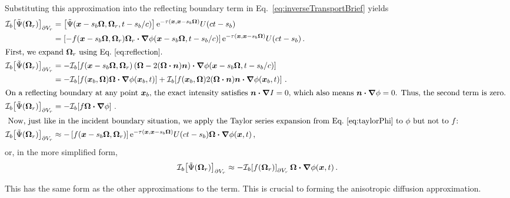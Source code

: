 Substituting this approximation into the reflecting boundary term in
Eq.~\eqref{eq:inverseTransportBrief} yields
\begin{align*}
\lopinv{b}{\tilde\Psi(\vec{\Omega}_r)}_{\partial V_r}
  &= \left[\tilde\Psi(\vec{x} - s_b\vec{\Omega}, \vec{\Omega}_r, t - s_b/c)
  \right]
    \eexp^{ -\tau(\vec{x}, \vec{x} - s_b \vec{\Omega})}
    U(ct - s_b)
\\
  &= \left[-f(\vec{x} - s_b\vec{\Omega}, \vec{\Omega}_r) \vec{\Omega}_r 
  \vd \grad \phi(\vec{x} - s_b\vec{\Omega}, t - s_b/c) \right]
  \eexp^{ -\tau(\vec{x}, \vec{x} - s_b \vec{\Omega})}
  U(ct - s_b) \,.
\\ 
\intertext{First, we expand $\vec{\Omega}_r$ using Eq.~\eqref{eq:reflection}.
}
\lopinv{b}{\tilde\Psi(\vec{\Omega}_r)}_{\partial V_r}
  &= - \lopinv{b}{f(\vec{x} - s_b\vec{\Omega}, \vec{\Omega}_r)
\left(  \vec{\Omega} - 2(\vec{\Omega} \vd \vec{n}) \vec{n} \right)
  \vd \grad \phi(\vec{x} - s_b\vec{\Omega}, t - s_b/c) }
  \\
  &= -\lopinv{b}{f(\vec{x}_b,\vec{\Omega}) \vec{\Omega} \vd \grad
  \phi(\vec{x}_b,t)}
  + \lopinv{b}{f(\vec{x}_b,\vec{\Omega}) 2(\vec{\Omega} \vd \vec{n}) \vec{n} \vd
  \grad \phi(\vec{x}_b,t) } \,.
\\ 
\intertext{On a reflecting boundary at any point $\vec{x}_b$, the exact
intensity satisfies $\vec{n} \vd
\grad I = 0$, which also means $\vec{n} \vd \grad \phi=0$. Thus, the second
term is zero.
}
\lopinv{b}{\tilde\Psi(\vec{\Omega}_r)}_{\partial V_r}
&= -\lopinv{b}{f \vec{\Omega} \vd \grad \phi} \,.
\\ \intertext{ Now, just like in the incident boundary situation, we apply the
Taylor
series expansion from Eq.~\eqref{eq:taylorPhi} to $\phi$ but not to $f$:
}
\lopinv{b}{\tilde\Psi(\vec{\Omega}_r)}_{\partial V_r}
&\approx
-\left[f(\vec{x} - s_b\vec{\Omega}, \vec{\Omega}_r)
  \right]
  \eexp^{ -\tau(\vec{x}, \vec{x} - s_b \vec{\Omega})}
  U(ct - s_b) \vec{\Omega} \vd \grad \phi(\vec{x}, t)\,,
\end{align*}
or, in the more simplified form,
\begin{equation} \label{eq:reflApprox}
\mathcal{I}_{b}\!\left[\tilde\Psi(\bm{\Omega}_r)\right]_{\partial V_r}
\approx  
- \mathcal{I}_{b}\!\left[f(\bm{\Omega}_r)\right]_{\partial V_r}
\bm{\Omega} \bm{\cdot} \bm{\nabla} \phi(\bm{x}, t) \,.
\end{equation}

This has the same form as the other approximations to the term. This is crucial
to forming the anisotropic diffusion approximation.

